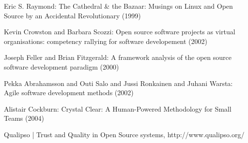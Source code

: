 \documentclass[lnbip]{svmultln}
\begin{document}
\begin{thebibliography}{5}
 Eric S. Raymond: The Cathedral \& the Bazaar:
  Musings on {Linux} and Open Source by an Accidental Revolutionary
  (1999)

 Kevin Crowston and Barbara Scozzi: Open source
  software projects as virtual organisations: competency rallying for
  software developement (2002)

 Joseph Feller and Brian Fitzgerald: A
  framework analysis of the open source software development paradigm
  (2000)

 Pekka Abrahamsson and Outi Salo and Jussi
  Ronkainen and Juhani Warsta: Agile software development methods
  (2002)

 Alistair Cockburn: Crystal Clear: A
  Human-Powered Methodology for Small Teams (2004)












 Qualipso | Trust and Quality in Open Source
  systems, http://www.qualipso.org/
\end{thebibliography}
\end{document}
